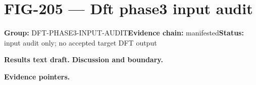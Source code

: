 \clearpage
\section{FIG-205 --- Dft phase3 input audit}
\label{figpage:fig-205}
\textbf{Group:} DFT-PHASE3-INPUT-AUDIT\quad \textbf{Evidence chain:} manifested\quad \textbf{Status:} input audit only; no accepted target DFT output

\textbf{Results text draft.} 
\textbf{Discussion and boundary.} 


\textbf{Evidence pointers.}



\vfill
